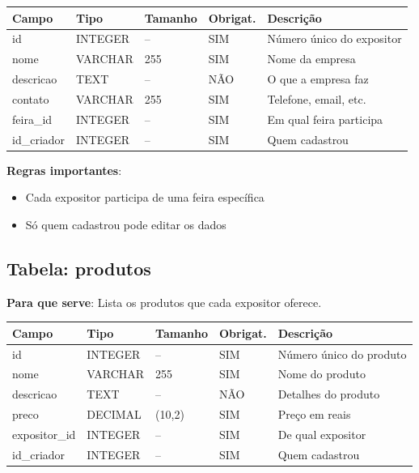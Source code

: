 \documentclass[12pt,a4paper]{article}
\begin{document}
\begin{longtable}{|p{3cm}|p{2cm}|p{2cm}|p{1.5cm}|p{5cm}|}
\hline
\textbf{Campo} & \textbf{Tipo} & \textbf{Tamanho} & \textbf{Obrigat.} & \textbf{Descrição} \\
\hline
\endhead
id & INTEGER & -- & SIM & Número único do expositor \\
\hline
nome & VARCHAR & 255 & SIM & Nome da empresa \\
\hline
descricao & TEXT & -- & NÃO & O que a empresa faz \\
\hline
contato & VARCHAR & 255 & SIM & Telefone, email, etc. \\
\hline
feira\_id & INTEGER & -- & SIM & Em qual feira participa \\
\hline
id\_criador & INTEGER & -- & SIM & Quem cadastrou \\
\hline
\end{longtable}

\textbf{Regras importantes}:
\begin{itemize}
    \item Cada expositor participa de uma feira específica
    \item Só quem cadastrou pode editar os dados
\end{itemize}

\subsection{Tabela: produtos}

\textbf{Para que serve}: Lista os produtos que cada expositor oferece.

\begin{longtable}{|p{3cm}|p{2cm}|p{2cm}|p{1.5cm}|p{5cm}|}
\hline
\textbf{Campo} & \textbf{Tipo} & \textbf{Tamanho} & \textbf{Obrigat.} & \textbf{Descrição} \\
\hline
\endhead
id & INTEGER & -- & SIM & Número único do produto \\
\hline
nome & VARCHAR & 255 & SIM & Nome do produto \\
\hline
descricao & TEXT & -- & NÃO & Detalhes do produto \\
\hline
preco & DECIMAL & (10,2) & SIM & Preço em reais \\
\hline
expositor\_id & INTEGER & -- & SIM & De qual expositor \\
\hline
id\_criador & INTEGER & -- & SIM & Quem cadastrou \\
\hline
\end{longtable}
\end{document}
